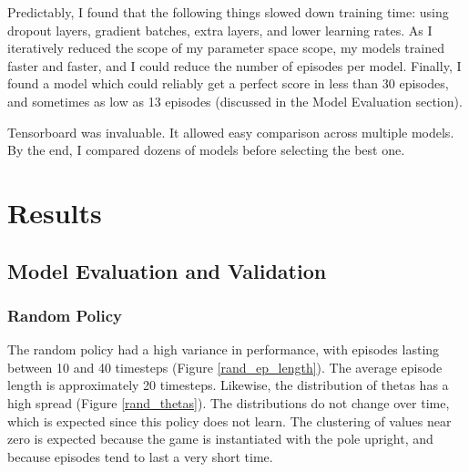 \documentclass[12pt,a4paper]{article}
\begin{document}
Predictably, I found that the following things slowed down training time: using dropout layers, gradient batches, extra layers, and lower learning rates. As I iteratively reduced the scope of my parameter space scope, my models trained faster and faster, and I could reduce the number of episodes per model. Finally, I found a model which could reliably get a perfect score in less than 30 episodes, and sometimes as low as 13 episodes (discussed in the Model Evaluation section).

Tensorboard was invaluable. It allowed easy comparison across multiple models. By the end, I compared dozens of models before selecting the best one. 


\section{Results}
%
\subsection*{Model Evaluation and Validation}

\subsubsection*{Random Policy}

The random policy had a high variance in performance, with episodes lasting between 10 and 40 timesteps (Figure \ref{rand_ep_length}).  The average episode length is approximately 20 timesteps. Likewise, the distribution of thetas has a high spread (Figure \ref{rand_thetas}). The distributions do not change over time, which is expected since this policy does not learn. The clustering of values near zero is expected because the game is instantiated with the pole upright, and because episodes tend to last a very short time.
\end{document}
